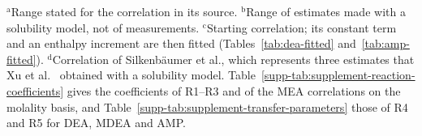 \begin{table}[pos=!htbp]
\begin{tabular}{@{}llllrr@{}}
\bottomrule
\end{tabular}
\par\smallskip\parbox{\linewidth}{\footnotesize\raggedright $^{\mathrm{a}}$Range stated for the correlation in its source. $^{\mathrm{b}}$Range of estimates made with a solubility model, not of measurements. $^{\mathrm{c}}$Starting correlation; its constant term and an enthalpy increment are then fitted (Tables~\ref{tab:dea-fitted} and~\ref{tab:amp-fitted}). $^{\mathrm{d}}$Correlation of Silkenb\"aumer et al., which represents three estimates that Xu et al.\ \cite{xuRepresentationEquilibriumSolubility1992} obtained with a solubility model. Table~\ref{supp-tab:supplement-reaction-coefficients} gives the coefficients of R1--R3 and of the MEA correlations on the molality basis, and Table~\ref{supp-tab:supplement-transfer-parameters} those of R4 and R5 for DEA, MDEA and AMP.}
\end{table}
